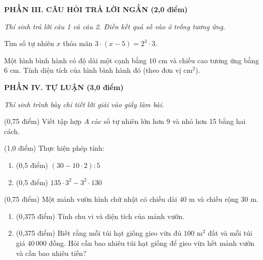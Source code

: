 \documentclass[12pt,a4paper]{article}
\begin{document}
\setcounter{ex}{0}
\noindent\textbf{\large PHẦN III. CÂU HỎI TRẢ LỜI NGẮN (2,0 điểm)}

\textit{Thí sinh trả lời câu 1 và câu 2. Điền kết quả số vào ô trống tương ứng.}

\vspace{1mm}
\begin{ex}
Tìm số tự nhiên $x$ thỏa mãn $3 \cdot (x - 5) = 2^3 \cdot 3$. 
\end{ex}

\begin{ex}
Một hình bình hành có độ dài một cạnh bằng $10\text{ cm}$ và chiều cao tương ứng bằng $6\text{ cm}$. Tính diện tích của hình bình hành đó (theo đơn vị $\text{cm}^2$). 
\end{ex}


\setcounter{ex}{0}
\noindent\textbf{\large PHẦN IV. TỰ LUẬN (3,0 điểm)}

\textit{Thí sinh trình bày chi tiết lời giải vào giấy làm bài.}

\vspace{1mm}
\begin{ex} (0,75 điểm)
Viết tập hợp $A$ các số tự nhiên lớn hơn 9 và nhỏ hơn 15 bằng hai cách.
\end{ex}
\vspace{1.5mm}

\begin{ex} (1,0 điểm)
Thực hiện phép tính:
\begin{enumerate}[label=\textbf{\alph*)}, leftmargin=0.8cm, itemsep=2pt]
\item (0,5 điểm) $(30 - 10 \cdot 2) : 5$
\item (0,5 điểm) $135 \cdot 3^2 - 3^2 \cdot 130$
\end{enumerate}
\end{ex}
\vspace{1.5mm}

\begin{ex} (0,75 điểm)
Một mảnh vườn hình chữ nhật có chiều dài $40\text{ m}$ và chiều rộng $30\text{ m}$.
\begin{enumerate}[label=\textbf{\alph*)}, leftmargin=0.8cm, itemsep=2pt]
\item (0,375 điểm) Tính chu vi và diện tích của mảnh vườn.
\item (0,375 điểm) Biết rằng mỗi túi hạt giống gieo vừa đủ $100\text{ m}^2$ đất và mỗi túi giá $40\,000$ đồng. Hỏi cần bao nhiêu túi hạt giống để gieo vừa hết mảnh vườn và cần bao nhiêu tiền?
\end{enumerate}
\end{ex}
\vspace{1.5mm}
\end{document}
